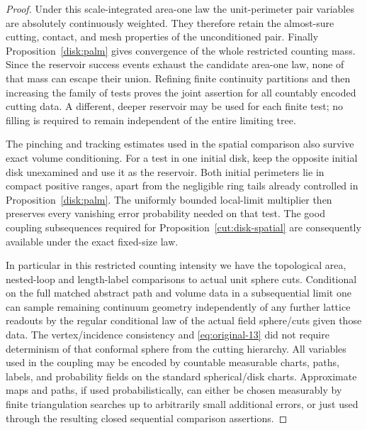 \begin{proof}
Under this scale-integrated area-one law the unit-perimeter pair variables
are absolutely continuously weighted.  They therefore retain the
almost-sure cutting, contact, and mesh properties of the unconditioned pair.
Finally Proposition~\ref{disk:palm} gives convergence of the whole restricted
counting mass.  Since the reservoir success events exhaust the candidate
area-one law, none of that mass can escape their union.  Refining finite
continuity partitions and then increasing the family of tests proves the
joint assertion for all countably encoded cutting data.  A different,
deeper reservoir may be used for each finite test; no filling is required to
remain independent of the entire limiting tree.

The pinching and tracking estimates used in the spatial comparison also
survive exact volume conditioning.  For a test in one initial disk, keep
the opposite initial disk unexamined and use it as the reservoir.  Both
initial perimeters lie in compact positive ranges, apart from the negligible
ring tails already controlled in Proposition~\ref{disk:palm}.  The uniformly
bounded local-limit multiplier then preserves every vanishing error
probability needed on that test.  The good coupling subsequences required
for Proposition~\ref{cut:disk-spatial} are consequently available under the
exact fixed-size law.


In particular in this restricted counting intensity we have the topological area, nested-loop and length-label comparisons to actual unit sphere cuts.
Conditional on the full matched abstract path and volume data in a subsequential limit one can sample remaining continuum geometry independently of any further lattice readouts by the regular conditional law of the actual field sphere/cuts given those data.
The vertex/incidence consistency and \eqref{eq:original-13} did not require determinism of that conformal sphere from the cutting hierarchy.
All variables used in the coupling may be encoded by countable measurable charts, paths, labels, and probability fields on the standard spherical/disk charts.
Approximate maps and paths, if used probabilistically, can either be chosen measurably by finite triangulation searches up to arbitrarily small additional errors, or just used through the resulting closed sequential comparison assertions.

\end{proof}

